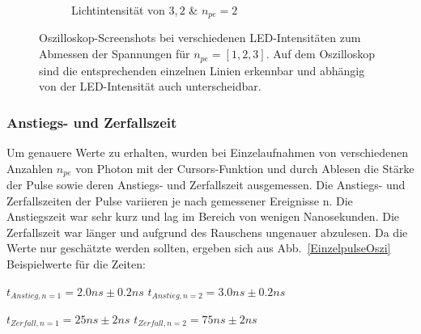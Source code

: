 \documentclass[12pt]{article}
\begin{document}
\begin{figure}[h!]
\begin{subfigure}{0.32\textwidth}
    \caption{Lichtintensität von $3,2$ \& $n_{pe} = 2$}
  \end{subfigure}
  \caption{Oszilloskop-Screenshots bei verschiedenen LED-Intensitäten zum Abmessen der Spannungen für $n_{pe}=[1,2,3]$. Auf dem Oszilloskop sind die entsprechenden einzelnen Linien erkennbar und abhängig von der LED-Intensität auch unterscheidbar.}
  \label{PulseOsziKombi}
\end{figure}


\subsubsection{Anstiegs- und Zerfallszeit}
Um genauere Werte zu erhalten, wurden bei Einzelaufnahmen von verschiedenen Anzahlen $n_{pe}$ von Photon mit der Cursors-Funktion und durch Ablesen die Stärke der Pulse sowie deren Anstiegs- und Zerfallszeit ausgemessen.
Die Anstiegs- und Zerfallszeiten der Pulse variieren je nach gemessener Ereignisse n.
Die Anstiegszeit war sehr kurz und lag im Bereich von wenigen Nanosekunden.
Die Zerfallszeit war länger und aufgrund des Rauschens ungenauer abzulesen.
Da die Werte nur geschätzte werden sollten, ergeben sich aus Abb.~\ref{EinzelpulseOszi} Beispielwerte für die Zeiten:

$t_{Anstieg, n=1} = 2.0ns \pm0.2ns$
\quad $t_{Anstieg, n=2} = 3.0ns \pm0.2ns$  


$t_{Zerfall, n=1} = 25ns \pm2ns$
\quad$t_{Zerfall, n=2} = 75ns \pm2ns$
\end{document}

